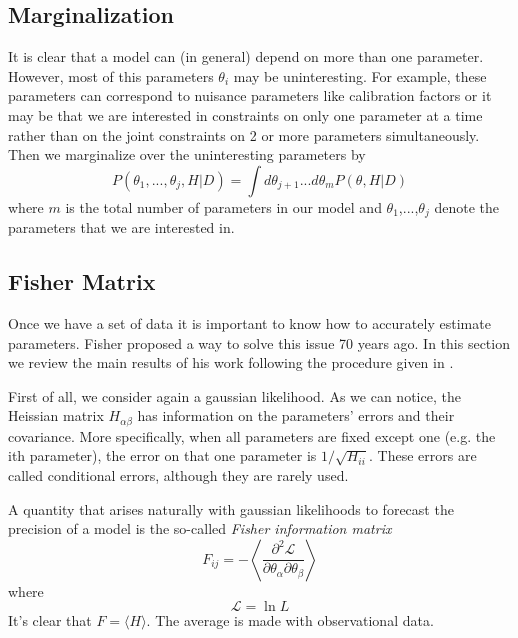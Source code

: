 \documentclass[onecolumn,           %
               showpacs,            %
               preprintnumbers,     %
               aps,                 %
               prl,          	    %
               letterpaper,             %
               superscriptaddress,      %
               nofootinbib,         %
               tightenlines,        %
               floats,floatfix      %
               ,usenatbib,
               ]{revtex4-1}
\begin{document}
\subsection{Marginalization}

It is clear that a model can (in general) depend on more than one parameter. However, most of this parameters $\theta_i$ may be uninteresting. For example, these parameters can correspond to nuisance parameters like calibration factors or it may be that we are interested in constraints on only one parameter at a time rather than on the joint constraints on 2 or more parameters simultaneously. Then we marginalize over the uninteresting parameters by
\begin{equation}
P(\theta_1,...,\theta_j,H|D)=\int d\theta_{j+1}...d\theta_{m}P(\theta,H|D)
\end{equation}
where $m$ is the total number of parameters in our model and $\theta_1$,...,$\theta_j$ denote the parameters that we are interested in.

\subsection{Fisher Matrix}

Once we have a set of data it is important to know how to accurately estimate parameters. Fisher \cite{Fisher} proposed a way to solve this issue 70 years ago. In this section we review the main results of his work following the procedure given in \cite{LiV}.

First of all, we consider again a gaussian likelihood. As we can notice, the Heissian matrix $H_{\alpha\beta}$ has information on the parameters' errors and their covariance. More specifically, when all parameters are fixed except one (e.g. the ith parameter), the error on that one parameter is $1/\sqrt{H_{ii}}$. These errors are called conditional errors, although they are rarely used.

A quantity that arises naturally with gaussian likelihoods to forecast the precision of a model is the so-called \textit{Fisher information matrix}
\begin{equation}
F_{ij}=-\left\langle \frac{\partial^2 \mathcal{L}}{\partial \theta_\alpha \partial \theta_\beta}\right\rangle
\end{equation}
where 
\begin{equation}
\mathcal{L}=\ln L
\end{equation}
It's clear that $F=\langle H\rangle$. The average is made with observational data. 
\end{document}
